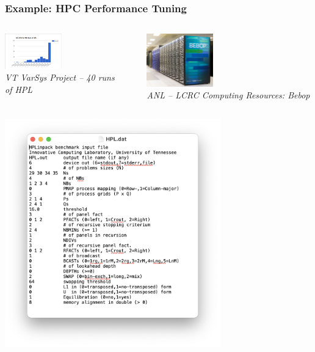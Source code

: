 \documentclass[aspectratio=169]{beamer}
\begin{document}
\begin{frame}\frametitle{Example: HPC Performance Tuning}
\begin{columns}
\begin{column}{0.45\textwidth}
\begin{center}
\includegraphics[width=0.5\textwidth]{../img/moo_old/varsys_hist.png}\\
{\tiny \sl
VT VarSys Project -- 40 runs of HPL
}
\end{center}
\end{column}
\begin{column}{0.1\textwidth}
$\quad$
\end{column}
\begin{column}{0.45\textwidth}
\begin{center}
\includegraphics[width=0.4\textwidth]{../img/probs/anl-bebop.png}\\
{\tiny \sl
ANL -- LCRC Computing Resources: Bebop
}
\end{center}
\end{column}
\end{columns}
\begin{columns}
\begin{column}{.3\textwidth}
\begin{center}
\includegraphics[width=0.7\textwidth]{../img/probs/hpl_dat.png}\\

\end{center}
\end{column}
\end{columns}
\end{frame}
\end{document}
